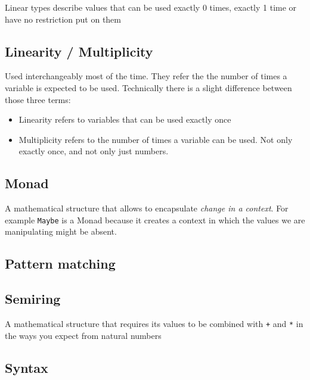 \documentclass[
]{article}
\providecommand{\tightlist}{%
  \setlength{\itemsep}{0pt}\setlength{\parskip}{0pt}}
\begin{document}
Linear types describe values that can be used exactly 0 times, exactly 1
time or have no restriction put on them

\hypertarget{linearity-multiplicity}{%
\subsection{Linearity / Multiplicity}\label{linearity-multiplicity}}

Used interchangeably most of the time. They refer the the number of
times a variable is expected to be used. Technically there is a slight
difference between those three terms:

\begin{itemize}
\tightlist
\item
  Linearity refers to variables that can be used exactly once
\item
  Multiplicity refers to the number of times a variable can be used. Not
  only exactly once, and not only just numbers.
\end{itemize}

\hypertarget{monad}{%
\subsection{Monad}\label{monad}}

A mathematical structure that allows to encapsulate \emph{change in a
context}. For example \texttt{Maybe} is a Monad because it creates a
context in which the values we are manipulating might be absent.

\hypertarget{pattern-matching-1}{%
\subsection{Pattern matching}\label{pattern-matching-1}}

\hypertarget{semiring}{%
\subsection{Semiring}\label{semiring}}

A mathematical structure that requires its values to be combined with
\texttt{+} and \texttt{*} in the ways you expect from natural numbers

\hypertarget{syntax-1}{%
\subsection{Syntax}\label{syntax-1}}
\end{document}

